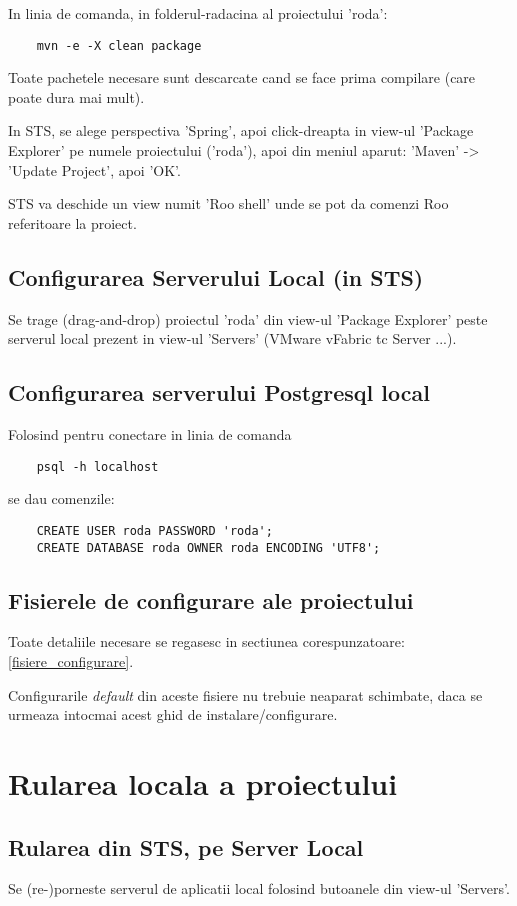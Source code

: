 In linia de comanda, in folderul-radacina al proiectului 'roda':
\begin{lstlisting}
	mvn -e -X clean package
\end{lstlisting}

Toate pachetele necesare sunt descarcate cand se face prima compilare (care poate dura mai mult).

In STS, se alege perspectiva 'Spring', apoi click-dreapta in view-ul 'Package
Explorer' pe numele proiectului ('roda'), apoi din meniul aparut:
'Maven' -> 'Update Project', apoi 'OK'.

STS va deschide un view numit 'Roo shell' unde se pot da comenzi Roo referitoare
la proiect.

\subsection{Configurarea Serverului Local (in STS)}
Se trage (drag-and-drop) proiectul 'roda' din view-ul 'Package Explorer' 
peste serverul local prezent in view-ul 'Servers' (VMware vFabric tc Server ...).

\subsection{Configurarea serverului Postgresql local}
Folosind pentru conectare in linia de comanda
\begin{lstlisting}
	psql -h localhost
\end{lstlisting}
se dau comenzile:
\begin{lstlisting}
	CREATE USER roda PASSWORD 'roda';
	CREATE DATABASE roda OWNER roda ENCODING 'UTF8';
\end{lstlisting}

\subsection{Fisierele de configurare ale proiectului}
Toate detaliile necesare se regasesc in sectiunea
corespunzatoare: \ref{fisiere_configurare}.

Configurarile \emph{default} din aceste fisiere nu trebuie neaparat
schimbate, daca se urmeaza intocmai acest ghid de instalare/configurare.

\section{Rularea locala a proiectului}

\subsection{Rularea din STS, pe Server Local}
Se (re-)porneste serverul de aplicatii local folosind butoanele din view-ul
'Servers'.

